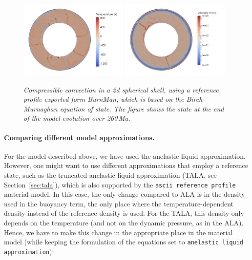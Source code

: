 \begin{figure}
  \includegraphics[width=0.48\textwidth]{cookbooks/burnman/doc/temperature.png}
  \hfill
  \includegraphics[width=0.48\textwidth]{cookbooks/burnman/doc/viscosity.png}
  \caption{\it Compressible convection in a 2d spherical shell, using a reference profile exported
               form BurnMan, which is based on the Birch-Murnaghan equation of state. The figure shows the
               state at the end of the model evolution over 260\,Ma.}
  \label{fig:burnman-convection}
\end{figure}

\paragraph{Comparing different model approximations.}
For the model described above, we have used the anelastic liquid approximation. However, one might want
to use different approximations that employ a reference state, such as the truncated anelastic liquid
approximation (TALA, see Section~\ref{sec:tala}), which is also supported by the
\texttt{ascii reference profile} material model. In this case, the only change compared to ALA
is in the density used in the buoyancy term, the only place where the temperature-dependent density
instead of the reference density is used. For the TALA, this density only depends on the temperature
(and not on the dynamic pressure, as in the ALA). Hence, we have to make this change in the appropriate
place in the material model (while keeping the formulation of the equations set to
\texttt{anelastic liquid approximation}):


